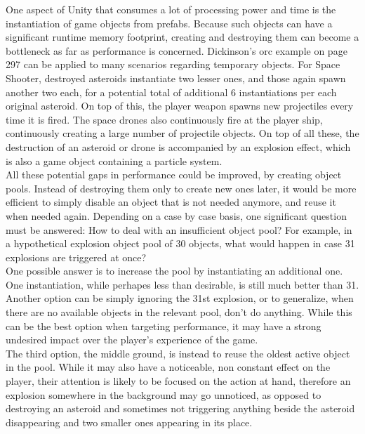 One aspect of Unity that consumes a lot of processing power and time is the instantiation of game objects from prefabs. Because such objects can have a significant runtime memory footprint, creating and destroying them can become a bottleneck as far as performance is concerned. Dickinson's orc example on page 297\cite{optimizationbook} can be applied to many scenarios regarding temporary objects. For Space Shooter, destroyed asteroids instantiate two lesser ones, and those again spawn another two each, for a potential total of additional 6 instantiations per each original asteroid. On top of this, the player weapon spawns new projectiles every time it is fired. The space drones also continuously fire at the player ship, continuously creating a large number of projectile objects. On top of all these, the destruction of an asteroid or drone is accompanied by an explosion effect, which is also a game object containing a particle system.\\
 All these potential gaps in performance could be improved, by creating object pools. Instead of destroying them only to create new ones later, it would be more efficient to simply disable an object that is not needed anymore, and reuse it when needed again. Depending on a case by case basis, one significant question must be answered: How to deal with an insufficient object pool? For example, in a hypothetical explosion object pool of 30 objects, what would happen in case 31 explosions are triggered at once? \\
 One possible answer is to increase the pool by instantiating an additional one. One instantiation, while perhapes less than desirable, is still much better than 31. \\
 Another option can be simply ignoring the 31st explosion, or to generalize, when there are no available objects in the relevant pool, don't do anything. While this can be the best option when targeting performance, it may have a strong undesired impact over the player's experience of the game. \\
 The third option, the middle ground, is instead to reuse the oldest active object in the pool. While it may also have a noticeable, non constant effect on the player, their attention is likely to be focused on the action at hand, therefore an explosion somewhere in the background may go unnoticed, as opposed to destroying an asteroid and sometimes not triggering anything beside the asteroid disappearing and two smaller ones appearing in its place. \\ \\
